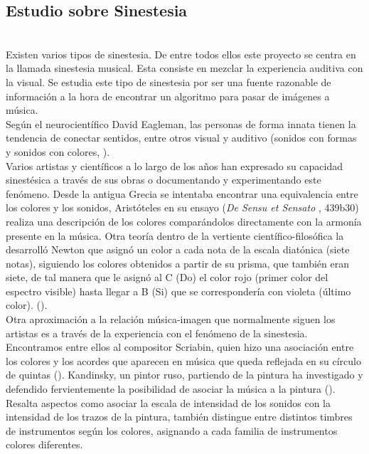 \subsection{Estudio sobre Sinestesia}
\label{subsubsec:estudioSinestesia}

\\

Existen varios tipos de sinestesia. De entre todos ellos este proyecto se centra en la llamada sinestesia musical. Esta consiste en mezclar la experiencia auditiva con la visual. Se estudia este tipo de sinestesia por ser una fuente razonable de información a la hora de encontrar un algoritmo para pasar de imágenes a música.
\\Según el neurocientífico David Eagleman, las personas de forma innata tienen la tendencia de conectar sentidos, entre otros visual y auditivo (sonidos con formas y sonidos con colores, \cite{VideoRedesFliparColores}).\\

Varios artistas y científicos a lo largo de los años han expresado su capacidad sinestésica a través de sus obras o documentando y experimentando este fenómeno. Desde la antigua Grecia se intentaba encontrar una equivalencia entre los colores y los sonidos, Aristóteles en su ensayo (\emph{De Sensu et Sensato} \cite{DeSensuEtSensato}, 439b30) realiza una descripción de los colores comparándolos directamente con la armonía presente en la música. Otra teoría dentro de la vertiente científico-filosófica la desarrolló Newton que asignó un color a cada nota de la escala diatónica (siete notas), siguiendo los colores obtenidos a partir de su prisma, que también eran siete, de tal manera que le asignó al C (Do) el color rojo (primer color del espectro visible) hasta llegar a B (Si) que se correspondería con violeta (último color). (\cite{OpticksNewton}).\\ 

Otra aproximación a la relación música-imagen que normalmente siguen los artistas es a través de la experiencia con el fenómeno de la sinestesia. Encontramos entre ellos al compositor Scriabin, quien hizo una asociación entre los colores y los acordes que aparecen en música que queda reflejada en su círculo de quintas (\cite{ScriabinQuintasColor}). Kandinsky, un pintor ruso, partiendo de la pintura ha investigado y defendido fervientemente la posibilidad de asociar la música a la pintura (\cite{ConcerningSpiritualArt}). Resalta aspectos como asociar la escala de intensidad de los sonidos con la intensidad de los trazos de la pintura, también distingue entre distintos timbres de instrumentos según los colores, asignando a cada familia de instrumentos colores diferentes.\\

